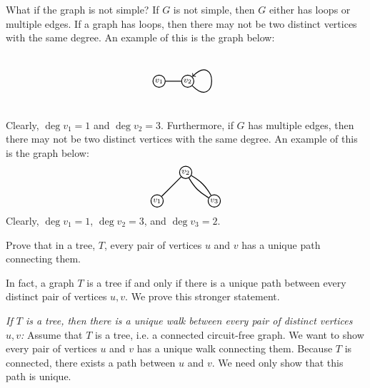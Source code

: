 \documentclass[11pt,letterpaper]{article}
\begin{document}
 What if the graph is not simple? If $G$ is not simple, then $G$ either has loops or multiple edges. If a graph has loops, then there may not be two distinct vertices with the same degree. An example of this is the graph below:
	\[
	\begin{tikzpicture}[scale=1]
	\node[draw,inner sep=1pt,minimum size=2pt,line width=0.03cm,circle] at (0, 0)   (a) {\footnotesize$v_1$};
	\node[draw,inner sep=1pt,minimum size=2pt,line width=0.03cm,circle] at (1, 0)   (b) {\footnotesize$v_2$};

	\path[line width=0.03cm] (a) edge (b);
	\path[line width=0.03cm,out=-45,in=45,looseness=10,->] (b) edge (b);
	\end{tikzpicture}
	\]
Clearly, $\deg v_1= 1$ and $\deg v_2= 3$. Furthermore, if $G$ has multiple edges, then there may not be two distinct vertices with the same degree. An example of this is the graph below: 
	\[
	\begin{tikzpicture}[scale=1]
	\node[draw,inner sep=1pt,minimum size=2pt,line width=0.03cm,circle] at (0, 0)   (a) {\footnotesize$v_1$};
	\node[draw,inner sep=1pt,minimum size=2pt,line width=0.03cm,circle] at (1, 1)   (b) {\footnotesize$v_2$};
	\node[draw,inner sep=1pt,minimum size=2pt,line width=0.03cm,circle] at (2, 0)   (c) {\footnotesize$v_3$};

	\path[line width=0.03cm] (a) edge (b);
	\path[line width=0.03cm,bend left=15] (b) edge (c);
	\path[line width=0.03cm,bend right=15] (b) edge (c);
	\end{tikzpicture}
	\]
Clearly, $\deg v_1= 1$, $\deg v_2= 3$, and $\deg v_3= 2$. 



\newpage



 Prove that in a tree, $T$, every pair of vertices $u$ and $v$ has a unique path connecting them. \pspace

\sol In fact, a graph $T$ is a tree if and only if there is a unique path between every distinct pair of vertices $u, v$. We prove this stronger statement. \pspace

{\itshape If $T$ is a tree, then there is a unique walk between every pair of distinct vertices $u, v$:} Assume that $T$ is a tree, i.e. a connected circuit-free graph. We want to show every pair of vertices $u$ and $v$ has a unique walk connecting them. Because $T$ is connected, there exists a path between $u$ and $v$. We need only show that this path is unique. \pspace
\end{document}
